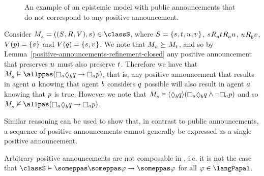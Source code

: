 \begin{example}\label{example-papal-differences}
\begin{figure}
    \caption{An example of an epistemic model with public announcements that do not correspond to any positive announcement.}\label{example-epistemic-model-2}
    \centering
\end{figure}

Consider $\kPModelAndTuple{\kStateS} \in \classS$, where $\kStates = \{\kStateS, \kStateT, \kStateU, \kStateV\}$, $\kStateS \kAccessibility{\agentA} \kStateT \kAccessibility{\agentA} \kStateU$, $\kStateU \kAccessibility{\agentB} \kStateV$, $\kValuation(\atomP) = \{\kStateS\}$ and $\kValuation(\atomQ) = \{\kStateS, \kStateV\}$.
We note that $\kPModel{\kStateU} \simulates \kPModel{\kStateT}$, and so by Lemma~\ref{positive-announcements-refinement-closed} any positive announcement that preserves $\kStateU$ must also preserve $\kStateT$.
Therefore we have that $\kPModel{\kStateS} \entails \allppas (\knowsA \suspectsB \atomQ \implies \knowsA \atomP)$, that is, any positive announcement that results in agent $a$ knowing that agent $b$ considers $q$ possible will also result in agent $a$ knowing that $p$ is true.
However we note that $\kPModel{\kStateS} \entails \announceE{\suspectsB \atomQ} (\knowsA \suspectsB \atomQ \land \neg \knowsA \atomP)$ and so $\kPModel{\kStateS} \nentails \allpas (\knowsA \suspectsB \atomQ \implies \knowsA \atomP)$.
\end{example}

Similar reasoning can be used to show that, in contrast to public announcements, a sequence of positive announcements cannot generally be expressed as a single positive announcement.

\begin{proposition}
Arbitrary positive announcements are not composable in \classS{}, i.e. it is not the case that $\classS \entails \someppas \someppas \phi \implies \someppas \phi$ for all $\phi \in \langPapal$.
\end{proposition}

